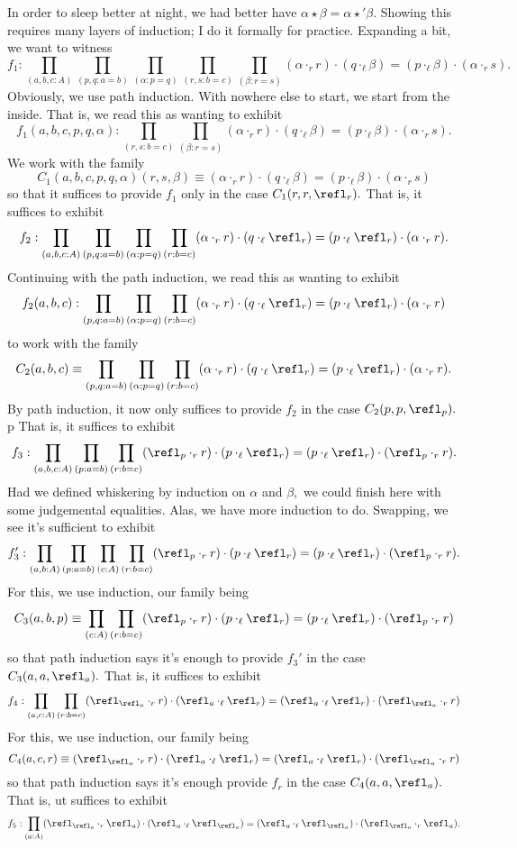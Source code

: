 In order to sleep better at night, we had better have $\alpha\star\beta=\alpha\star'\beta.$ Showing this requires many layers of induction; I do it formally for practice. Expanding a bit, we want to witness
\[f_1:\prod_{(a,b,c:A)}\prod_{(p,q:a=b)}\prod_{(\alpha:p=q)}\prod_{(r,s:b=c)}\prod_{(\beta:r=s)}(\alpha\cdot_rr)\cdot(q\cdot_\ell\beta)=(p\cdot_\ell\beta)\cdot(\alpha\cdot_rs).\]
Obviously, we use path induction. With nowhere else to start, we start from the inside. That is, we read this as wanting to exhibit
\[f_1(a,b,c,p,q,\alpha):\prod_{(r,s:b=c)}\prod_{(\beta:r=s)}(\alpha\cdot_rr)\cdot(q\cdot_\ell\beta)=(p\cdot_\ell\beta)\cdot(\alpha\cdot_rs).\]
We work with the family
\[C_1(a,b,c,p,q,\alpha)(r,s,\beta)\equiv(\alpha\cdot_rr)\cdot(q\cdot_\ell\beta)=(p\cdot_\ell\beta)\cdot(\alpha\cdot_rs)\]
so that it suffices to provide $f_1$ only in the case $C_1(r,r,\refl_r).$ That is, it suffices to exhibit
\[f_2:\prod_{(a,b,c:A)}\prod_{(p,q:a=b)}\prod_{(\alpha:p=q)}\prod_{(r:b=c)}(\alpha\cdot_rr)\cdot(q\cdot_\ell\refl_r)=(p\cdot_\ell\refl_r)\cdot(\alpha\cdot_rr).\]
Continuing with the path induction, we read this as wanting to exhibit
\[f_2(a,b,c):\prod_{(p,q:a=b)}\prod_{(\alpha:p=q)}\prod_{(r:b=c)}(\alpha\cdot_rr)\cdot(q\cdot_\ell\refl_r)=(p\cdot_\ell\refl_r)\cdot(\alpha\cdot_rr)\]
to work with the family
\[C_2(a,b,c)\equiv\prod_{(p,q:a=b)}\prod_{(\alpha:p=q)}\prod_{(r:b=c)}(\alpha\cdot_rr)\cdot(q\cdot_\ell\refl_r)=(p\cdot_\ell\refl_r)\cdot(\alpha\cdot_rr).\]
By path induction, it now only suffices to provide $f_2$ in the case $C_2(p,p,\refl_p).$p That is, it suffices to exhibit
\[f_3:\prod_{(a,b,c:A)}\prod_{(p:a=b)}\prod_{(r:b=c)}(\refl_p\cdot_rr)\cdot(p\cdot_\ell\refl_r)=(p\cdot_\ell\refl_r)\cdot(\refl_p\cdot_rr).\]
Had we defined whiskering by induction on $\alpha$ and $\beta,$ we could finish here with some judgemental equalities. Alas, we have more induction to do. Swapping, we see it's sufficient to exhibit
\[f_3':\prod_{(a,b:A)}\prod_{(p:a=b)}\prod_{(c:A)}\prod_{(r:b=c)}(\refl_p\cdot_rr)\cdot(p\cdot_\ell\refl_r)=(p\cdot_\ell\refl_r)\cdot(\refl_p\cdot_rr).\]
For this, we use induction, our family being
\[C_3(a,b,p)\equiv\prod_{(c:A)}\prod_{(r:b=c)}(\refl_p\cdot_rr)\cdot(p\cdot_\ell\refl_r)=(p\cdot_\ell\refl_r)\cdot(\refl_p\cdot_rr)\]
so that path induction says it's enough to provide $f_3'$ in the case $C_3(a,a,\refl_a).$ That is, it suffices to exhibit
\[f_4:\prod_{(a,c:A)}\prod_{(r:b=c)}(\refl_{\refl_a}\cdot_rr)\cdot(\refl_a\cdot_\ell\refl_r)=(\refl_a\cdot_\ell\refl_r)\cdot(\refl_{\refl_a}\cdot_rr)\]
For this, we use induction, our family being
\[C_4(a,c,r)\equiv(\refl_{\refl_a}\cdot_rr)\cdot(\refl_a\cdot_\ell\refl_r)=(\refl_a\cdot_\ell\refl_r)\cdot(\refl_{\refl_a}\cdot_rr)\]
so that path induction says it's enough provide $f_r$ in the case $C_4(a,a,\refl_a).$ That is, ut suffices to exhibit
\[f_5:\prod_{(a:A)}(\refl_{\refl_a}\cdot_r\refl_a)\cdot(\refl_a\cdot_\ell\refl_{\refl_a})=(\refl_a\cdot_\ell\refl_{\refl_a})\cdot(\refl_{\refl_a}\cdot_r\refl_a).\]

